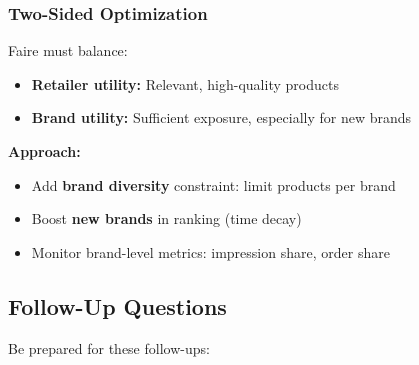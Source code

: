 \documentclass[11pt,letterpaper]{article}
\begin{document}
\subsubsection{Two-Sided Optimization}

Faire must balance:
\begin{itemize}
    \item \textbf{Retailer utility:} Relevant, high-quality products
    \item \textbf{Brand utility:} Sufficient exposure, especially for new brands
\end{itemize}

\textbf{Approach:}
\begin{itemize}
    \item Add \textbf{brand diversity} constraint: limit products per brand
    \item Boost \textbf{new brands} in ranking (time decay)
    \item Monitor brand-level metrics: impression share, order share
\end{itemize}

\subsection{Follow-Up Questions}

Be prepared for these follow-ups:
\end{document}
